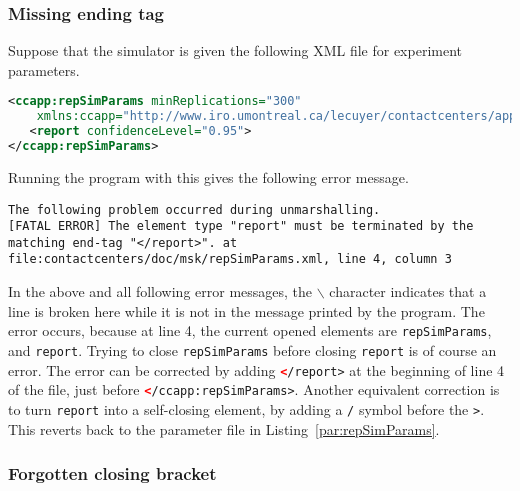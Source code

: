 \subsubsection{Missing ending tag}

Suppose that the simulator is given the following XML file for
experiment parameters.
\begin{lstlisting}[language=XML]
<ccapp:repSimParams minReplications="300"
    xmlns:ccapp="http://www.iro.umontreal.ca/lecuyer/contactcenters/app">
   <report confidenceLevel="0.95">
</ccapp:repSimParams>
\end{lstlisting}
Running the program with this gives the following error message.
\begin{lstlisting}[language={},breaklines,prebreak={\char92}]
The following problem occurred during unmarshalling.
[FATAL ERROR] The element type "report" must be terminated by the matching end-tag "</report>". at file:contactcenters/doc/msk/repSimParams.xml, line 4, column 3
\end{lstlisting}
In the above and all
following error messages, the $\backslash$ character indicates that a line
is broken here while it is not in the message printed by the program.
The error occurs, because at line 4, the current opened elements are
\texttt{rep\-Sim\-Params}, and \texttt{report}.
Trying to close \texttt{rep\-Sim\-Params} before closing
\texttt{report} is of course an error.
The error can be corrected by adding
\lstinline[language=XML]{</report>}
at the beginning of line 4 of the file, just before
\lstinline[language=XML]{</ccapp:repSimParams>}.
Another equivalent correction is to turn \texttt{report} into a
self-closing element, by adding a \texttt{/} symbol before the \texttt{>}.
This reverts back to the parameter file in
Listing~\ref{par:repSimParams}.

\subsubsection{Forgotten closing bracket}

